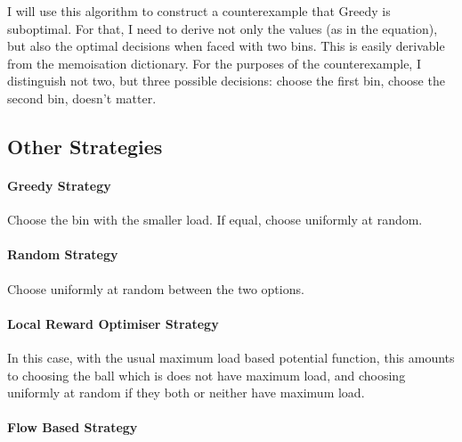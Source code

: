 I will use this algorithm to construct a counterexample that Greedy is suboptimal. For that, I need to derive not only the values (as in the equation), but also the optimal decisions when faced with two bins. This is easily derivable from the memoisation dictionary. For the purposes of the counterexample, I distinguish not two, but three possible decisions: choose the first bin, choose the second bin, doesn't matter.


\subsection{Other Strategies} \label{graphical-otherstrategies}


\paragraph{Greedy Strategy} Choose the bin with the smaller load. If equal, choose uniformly at random.


\paragraph{Random Strategy} Choose uniformly at random between the two options.



\paragraph{Local Reward Optimiser Strategy} In this case, with the usual maximum load based potential function, this amounts to choosing the ball which is does not have maximum load, and choosing uniformly at random if they both or neither have maximum load.


\paragraph{Flow Based Strategy}

